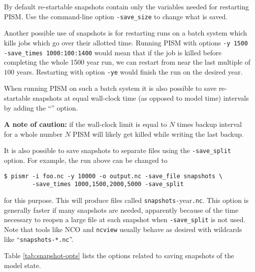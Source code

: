 By default re-startable snapshots contain only the variables needed for
restarting PISM. Use the command-line option \texttt{-save_size} to change what is saved.

Another possible use of snapshots is for restarting runs on a batch system which kills jobs which go over their allotted time.  Running PISM with options \texttt{-y 1500} \texttt{-save_times 1000:100:1400} would mean that if the job is killed before completing the whole 1500 year run, we can restart from near the last multiple of $100$ years.  Restarting with option \texttt{-ye} would finish the run on the desired year.

When running PISM on such a batch system it is also possible to save
re-startable snapshots at equal wall-clock time (as opposed to model time)
intervals by adding the ``'' option.

\textbf{A note of caution:} if the wall-clock limit is equal to $N$ times backup
interval for a whole number $N$ PISM will likely get killed while writing the
last backup.

It is also possible to save snapshots to separate files using the
\texttt{-save_split} option.  For example, the run above can be changed to
\begin{verbatim}
$ pismr -i foo.nc -y 10000 -o output.nc -save_file snapshots \
        -save_times 1000,1500,2000,5000 -save_split
\end{verbatim}
for this purpose.  This will produce files called
\texttt{snapshots-}year\texttt{.nc}.  This option is generally faster if many
snapshots are needed, apparently because of the time necessary to reopen a
large file at each snapshot when \texttt{-save_split} is not used.  Note
that tools like NCO\index{NCO (NetCDF Operators)!wildcards} and
\texttt{ncview} usually behave as desired with wildcards like ``\texttt{snapshots-*.nc}''.

Table \ref{tab:snapshot-opts} lists the options related to saving snapshots of the model state.

